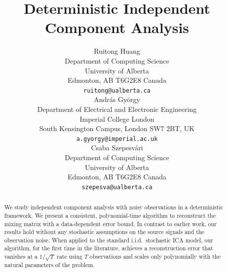 \documentclass{article} %
\title{Deterministic Independent Component Analysis}
\author{
Ruitong Huang \\
Department of Computing Science\\
University of Alberta \\
Edmonton, AB T6G2E8 Canada\\
\texttt{ruitong@ualberta.ca} \\
\And
Andr\'as Gy\"orgy \\
Department of Electrical and Electronic Engineering\\ 
Imperial College London\\ 
South Kensington Campus, London SW7 2BT, UK \\
\texttt{a.gyorgy@imperial.ac.uk} \\
\And
Csaba Szepesv\'ari \\
Department of Computing Science\\
University of Alberta \\
Edmonton, AB T6G2E8 Canada\\
\texttt{szepesva@ualberta.ca}
}
\theoremstyle{definition}
\begin{document}
\maketitle

\begin{abstract}
We study independent component analysis with noisy observations in a deterministic framework. We present a consistent, polynomial-time algorithm to reconstruct the mixing matrix with a data-dependent error bound. In contrast to earlier work, our results hold without any stochastic assumptions on the source signals and the observation noise. When applied
to the standard i.i.d.\ stochastic ICA model, 
our algorithm, for the first time in the literature, achieves a reconstruction error that vanishes at a $1/\sqrt{T}$ rate using $T$ observations and scales only polynomially with the natural parameters of the problem.  
\end{abstract}
\end{document}
